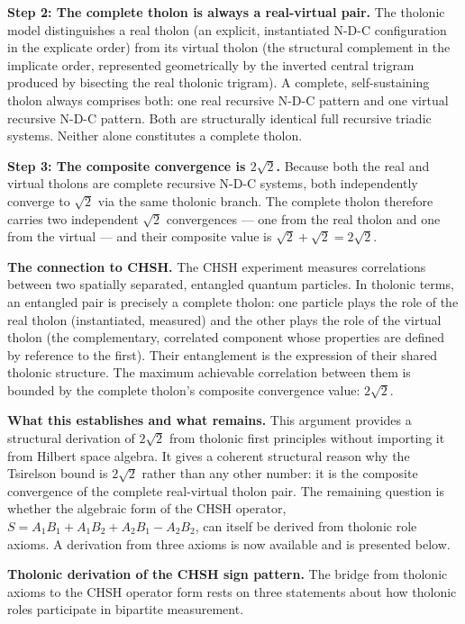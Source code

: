 \documentclass[
  11pt,
  letterpaper,
]{article}
\begin{document}
\textbf{Step 2: The complete tholon is always a real-virtual pair.} The
tholonic model distinguishes a real tholon (an explicit, instantiated
N-D-C configuration in the explicate order) from its virtual tholon (the
structural complement in the implicate order, represented geometrically
by the inverted central trigram produced by bisecting the real tholonic
trigram). A complete, self-sustaining tholon always comprises both: one
real recursive N-D-C pattern and one virtual recursive N-D-C pattern.
Both are structurally identical full recursive triadic systems. Neither
alone constitutes a complete tholon.

\textbf{Step 3: The composite convergence is \(2\sqrt{2}\).} Because
both the real and virtual tholons are complete recursive N-D-C systems,
both independently converge to \(\sqrt{2}\) via the same tholonic
branch. The complete tholon therefore carries two independent
\(\sqrt{2}\) convergences --- one from the real tholon and one from the
virtual --- and their composite value is
\(\sqrt{2} + \sqrt{2} = 2\sqrt{2}\).

\textbf{The connection to CHSH.} The CHSH experiment measures
correlations between two spatially separated, entangled quantum
particles. In tholonic terms, an entangled pair is precisely a complete
tholon: one particle plays the role of the real tholon (instantiated,
measured) and the other plays the role of the virtual tholon (the
complementary, correlated component whose properties are defined by
reference to the first). Their entanglement is the expression of their
shared tholonic structure. The maximum achievable correlation between
them is bounded by the complete tholon's composite convergence value:
\(2\sqrt{2}\).

\textbf{What this establishes and what remains.} This argument provides
a structural derivation of \(2\sqrt{2}\) from tholonic first principles
without importing it from Hilbert space algebra. It gives a coherent
structural reason why the Tsirelson bound is \(2\sqrt{2}\) rather than
any other number: it is the composite convergence of the complete
real-virtual tholon pair. The remaining question is whether the
algebraic form of the CHSH operator,
\(S = A_1B_1 + A_1B_2 + A_2B_1 - A_2B_2\), can itself be derived from
tholonic role axioms. A derivation from three axioms is now available
and is presented below.

\textbf{Tholonic derivation of the CHSH sign pattern.} The bridge from
tholonic axioms to the CHSH operator form rests on three statements
about how tholonic roles participate in bipartite measurement.
\end{document}
